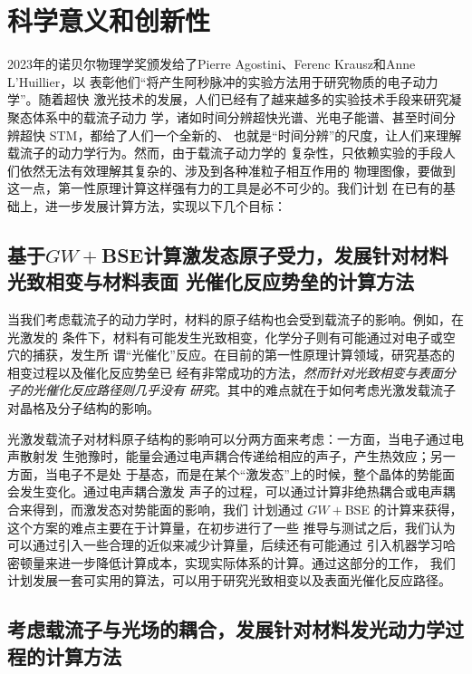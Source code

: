 \setcounter{section}{0}

\section{科学意义和创新性}

2023年的诺贝尔物理学奖颁发给了Pierre Agostini、Ferenc Krausz和Anne L'Huillier，以
表彰他们``{\kaishu{}将产生阿秒脉冲的实验方法用于研究物质的电子动力学}''。随着超快
激光技术的发展，人们已经有了越来越多的实验技术手段来研究凝聚态体系中的载流子动力
学，诸如时间分辨超快光谱、光电子能谱、甚至时间分辨超快 STM，都给了人们一个全新的、
也就是“时间分辨”的尺度，让人们来理解载流子的动力学行为。然而，由于载流子动力学的
复杂性，只依赖实验的手段人们依然无法有效理解其复杂的、涉及到各种准粒子相互作用的
物理图像，要做到这一点，第一性原理计算这样强有力的工具是必不可少的。我们计划
在\hnamd{}已有的基础上，进一步发展计算方法，实现以下几个目标：

\subsection{基于$GW+{}$BSE计算激发态原子受力，发展针对材料光致相变与材料表面
  光催化反应势垒的计算方法}


当我们考虑载流子的动力学时，材料的原子结构也会受到载流子的影响。例如，在光激发的
条件下，材料有可能发生光致相变，化学分子则有可能通过对电子或空穴的捕获，发生所
谓“光催化”反应。在目前的第一性原理计算领域，研究基态的相变过程以及催化反应势垒已
经有非常成功的方法，\emph{然而针对光致相变与表面分子的光催化反应路径则几乎没有
  研究}。其中的难点就在于如何考虑光激发载流子对晶格及分子结构的影响。

光激发载流子对材料原子结构的影响可以分两方面来考虑：一方面，当电子通过电声散射发
生弛豫时，能量会通过电声耦合传递给相应的声子，产生热效应；另一方面，当电子不是处
于基态，而是在某个“激发态”上的时候，整个晶体的势能面会发生变化。通过电声耦合激发
声子的过程，可以通过计算非绝热耦合或电声耦合来得到，而激发态对势能面的影响，我们
计划通过 $GW+{}$BSE 的计算来获得，这个方案的难点主要在于计算量，在初步进行了一些
推导与测试之后，我们认为可以通过引入一些合理的近似来减少计算量，后续还有可能通过
引入机器学习哈密顿量来进一步降低计算成本，实现实际体系的计算。通过这部分的工作，
我们计划发展一套可实用的算法，可以用于研究光致相变以及表面光催化反应路径。

\subsection{考虑载流子与光场的耦合，发展针对材料发光动力学过程的计算方法}


